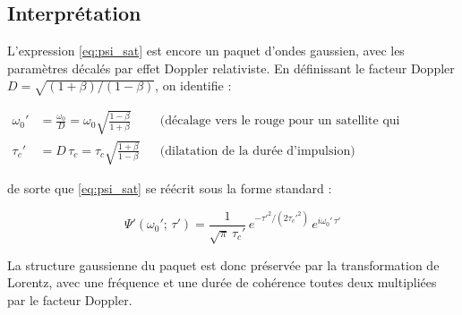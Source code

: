 \documentclass[12pt,a4paper]{article}
\begin{document}
\subsection*{Interprétation}

L'expression \eqref{eq:psi_sat} est encore un paquet d'ondes gaussien, avec les paramètres
décalés par effet Doppler relativiste. En définissant le facteur Doppler
$D = \sqrt{(1+\beta)/(1-\beta)}$, on identifie :

\begin{align}
    \omega_0' &= \frac{\omega_0}{D} = \omega_0\sqrt{\frac{1-\beta}{1+\beta}}
    && \text{(décalage vers le rouge pour un satellite qui s'éloigne)} \\[6pt]
    \tau_c'   &= D\,\tau_c = \tau_c\sqrt{\frac{1+\beta}{1-\beta}}
    && \text{(dilatation de la durée d'impulsion)}
\end{align}

de sorte que \eqref{eq:psi_sat} se réécrit sous la forme standard :

\begin{equation}
    \Psi'(\omega_0';\, \tau')
    = \frac{1}{\sqrt{\pi}\,\tau_c'}
      \, e^{-\tau'^2/(2\tau_c'^2)}
      \, e^{i\omega_0'\,\tau'}
\end{equation}

La structure gaussienne du paquet est donc préservée par la transformation de Lorentz,
avec une fréquence et une durée de cohérence toutes deux multipliées par le facteur Doppler.
\end{document}
